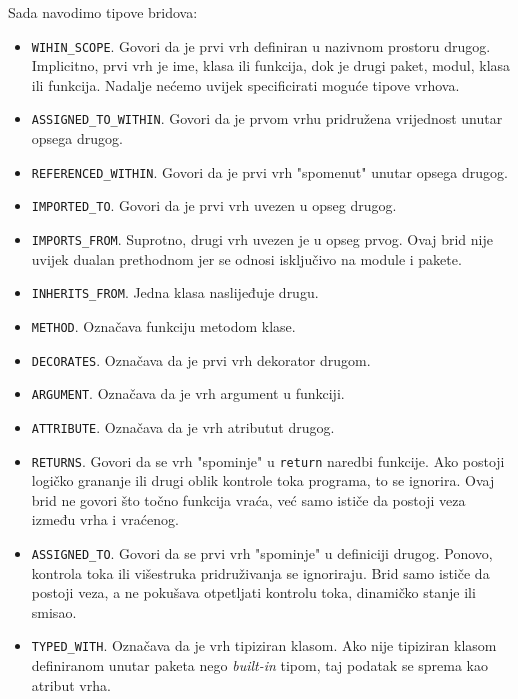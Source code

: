 Sada navodimo tipove bridova:
\begin{itemize}
\item \texttt{WIHIN_SCOPE}. Govori da je prvi vrh definiran u nazivnom prostoru drugog. Implicitno, prvi vrh je ime, klasa ili funkcija,
dok je drugi paket, modul, klasa ili funkcija. Nadalje nećemo uvijek specificirati moguće tipove vrhova.

\item \texttt{ASSIGNED_TO_WITHIN}. Govori da je prvom vrhu pridružena vrijednost unutar opsega drugog.
\item \texttt{REFERENCED_WITHIN}. Govori da je prvi vrh "spomenut" unutar opsega drugog.

\item \texttt{IMPORTED_TO}. Govori da je prvi vrh uvezen u opseg drugog.
\item \texttt{IMPORTS_FROM}. Suprotno, drugi vrh uvezen je u opseg prvog. Ovaj brid nije uvijek
dualan prethodnom jer se odnosi isključivo na module i pakete.

\item \texttt{INHERITS_FROM}. Jedna klasa naslijeđuje drugu.

\item \texttt{METHOD}. Označava funkciju metodom klase.
\item \texttt{DECORATES}. Označava da je prvi vrh dekorator drugom.
\item \texttt{ARGUMENT}. Označava da je vrh argument u funkciji.

\item \texttt{ATTRIBUTE}. Označava da je vrh atributut drugog.

\item \texttt{RETURNS}. Govori da se vrh "spominje" u \texttt{return} naredbi funkcije. Ako postoji
logičko grananje ili drugi oblik kontrole toka programa, to se ignorira. Ovaj brid ne govori
što točno funkcija vraća, već samo ističe da postoji veza između vrha i vraćenog.
\item \texttt{ASSIGNED_TO}. Govori da se prvi vrh "spominje" u definiciji drugog. Ponovo,
kontrola toka ili višestruka pridruživanja se ignoriraju. Brid samo ističe da postoji veza,
a ne pokušava otpetljati kontrolu toka, dinamičko stanje ili smisao.

\item \texttt{TYPED_WITH}. Označava da je vrh tipiziran klasom. Ako nije tipiziran klasom
definiranom unutar paketa nego \emph{built-in} tipom, taj podatak se sprema kao atribut vrha.

\end{itemize}

